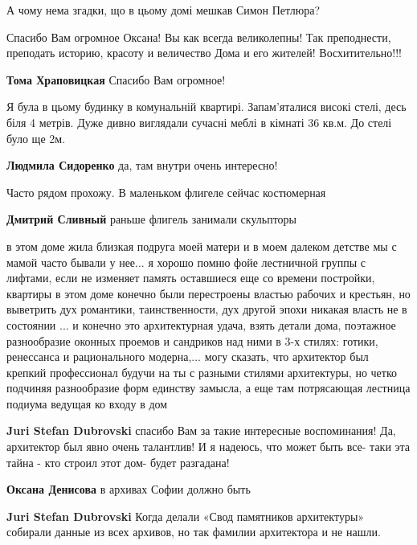\begin{itemize}
А чому нема згадки, що в цьому домі мешкав Симон Петлюра?


Спасибо Вам огромное Оксана! Вы как всегда великолепны! Так преподнести,
преподать историю, красоту и величество Дома и его жителей! Восхитительно!!!

\textbf{Тома Храповицкая} Спасибо Вам огромное!


Я була в цьому будинку в комунальній квартирі. Запам'яталися високі стелі, десь
біля 4 метрів. Дуже дивно виглядали сучасні меблі в кімнаті 36 кв.м. До стелі
було ще 2м.


\textbf{Людмила Сидоренко} да, там внутри очень интересно!

Часто рядом прохожу. В маленьком флигеле сейчас костюмерная

\textbf{Дмитрий Сливный} раньше флигель занимали скульпторы


в этом доме жила близкая подруга моей матери и в моем далеком детстве мы с
мамой часто бывали у нее... я хорошо помню фойе лестничной группы с лифтами,
если не изменяет память оставшиеся еще со времени постройки, квартиры в этом
доме конечно были перестроены властью рабочих и крестьян, но выветрить дух
романтики, таинственности, дух другой эпохи никакая власть не в состоянии ... и
конечно это архитектурная удача, взять детали дома, поэтажное разнообразие
оконных проемов и сандриков над ними в 3-х стилях: готики, ренессанса и
рационального модерна,... могу сказать, что архитектор был крепкий профессионал
будучи на ты с разными стилями архитектуры, но четко подчиняя разнообразие форм
единству замысла, а еще там потрясающая лестница подиума ведущая ко входу в дом

\begin{itemize} %
\textbf{Juri Stefan Dubrovski} спасибо Вам за такие интересные воспоминания! Да, архитектор был явно очень талантлив! И я надеюсь, что может быть все- таки эта тайна - кто строил этот дом- будет разгадана!

\textbf{Оксана Денисова} в архивах Софии должно быть

\textbf{Juri Stefan Dubrovski} Когда делали «Свод памятников архитектуры» собирали данные из всех архивов, но так фамилии архитектора и не нашли.


\end{itemize}
\end{itemize}
